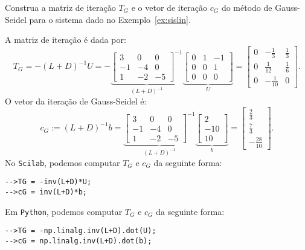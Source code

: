 \begin{ex}
  Construa a matriz de iteração $T_G$ e o vetor de iteração $c_G$ do método de Gauss-Seidel para o sistema dado no Exemplo~\ref{ex:sislin}.
\end{ex}
\begin{sol}
  A matriz de iteração é dada por:
  \begin{equation}
    T_G = -(L+D)^{-1}U = -
     \underbrace{\begin{bmatrix}
      3 & 0 & 0\\
      -1 & -4 & 0\\
      1 & -2 & -5
    \end{bmatrix}^{-1}}_{(L + D)^{-1}}
  \underbrace{\begin{bmatrix}
    0 & 1 & -1\\
    0 & 0 & 1\\
    0 & 0 & 0
  \end{bmatrix}}_{U} =
\begin{bmatrix}
  0 & -\frac{1}{3} & \frac{1}{3}\\
  0 & \frac{1}{12} & \frac{1}{6}\\
  0 & -\frac{1}{10} & 0
\end{bmatrix}.
  \end{equation}
O vetor da iteração de Gauss-Seidel é:
\begin{equation}
  c_G := (L+D)^{-1}b =
    \underbrace{\begin{bmatrix}
      3 & 0 & 0\\
      -1 & -4 & 0\\
      1 & -2 & -5
    \end{bmatrix}^{-1}}_{(L + D)^{-1}}
    \underbrace{\begin{bmatrix}
      2\\
      -10\\
      10
    \end{bmatrix}}_{b} =
    \begin{bmatrix}
      \frac{2}{3}\\
      \frac{7}{3}\\
      -\frac{28}{10}
    \end{bmatrix}.
\end{equation}
\ifisscilab
No \verb+Scilab+, podemos computar $T_G$ e $c_G$ da seguinte forma:
\begin{verbatim}
-->TG = -inv(L+D)*U;
-->cG = inv(L+D)*b;
\end{verbatim}
\fi
\ifispython
Em \verb+Python+, podemos computar $T_G$ e $c_G$ da seguinte forma:
\begin{verbatim}
-->TG = -np.linalg.inv(L+D).dot(U);
-->cG = np.linalg.inv(L+D).dot(b);
\end{verbatim}
\fi
\end{sol}

